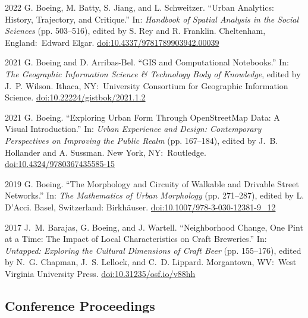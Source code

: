 \documentclass[11pt,letterpaper]{report}
\begin{document}
    \begin{tablist}

        \item[2022] \tab{}G. Boeing, M. Batty, S. Jiang, and L. Schweitzer. \enquote{Urban Analytics: History, Trajectory, and Critique.} In: \textit{Handbook of Spatial Analysis in the Social Sciences} (pp. 503--516), edited by S. Rey and R. Franklin. Cheltenham, England:\ Edward Elgar. \href{https://doi.org/10.4337/9781789903942.00039}{doi:10.4337/9781789903942.00039}

        \item[2021] \tab{}G. Boeing and D. Arribas-Bel. \enquote{GIS and Computational Notebooks.} In: \textit{The Geographic Information Science \& Technology Body of Knowledge}, edited by J.~P. Wilson. Ithaca, NY:\ University Consortium for Geographic Information Science. \href{https://doi.org/10.22224/gistbok/2021.1.2}{doi:10.22224/gistbok/2021.1.2}

        \item[2021] \tab{}G. Boeing. \enquote{Exploring Urban Form Through OpenStreetMap Data: A Visual Introduction.} In: \textit{Urban Experience and Design: Contemporary Perspectives on Improving the Public Realm} (pp. 167--184), edited by J.~B. Hollander and A. Sussman. New York, NY:\ Routledge. \href{https://doi.org/10.4324/9780367435585-15}{doi:10.4324/9780367435585-15}

        \item[2019] \tab{}G. Boeing. \enquote{The Morphology and Circuity of Walkable and Drivable Street Networks.} In: \textit{The Mathematics of Urban Morphology} (pp. 271--287), edited by L. D'Acci. Basel, Switzerland: Birkh{\"a}user. \href{https://doi.org/10.1007/978-3-030-12381-9_12}{doi:10.1007/978-3-030-12381-9\_12}

        \item[2017] \tab{}J.~M. Barajas, G. Boeing, and J. Wartell. \enquote{Neighborhood Change, One Pint at a Time: The Impact of Local Characteristics on Craft Breweries.} In: \textit{Untapped: Exploring the Cultural Dimensions of Craft Beer} (pp. 155--176), edited by N.~G. Chapman, J.~S. Lellock, and C.~D. Lippard. Morgantown, WV:\ West Virginia University Press. \href{https://doi.org/10.31235/osf.io/v88hh}{doi:10.31235/osf.io/v88hh}

    \end{tablist}



    \subsection*{Conference Proceedings}
\end{document}
